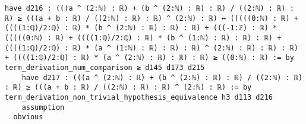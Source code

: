 \documentclass{article}
\begin{document}
\begin{tcolorbox}[colback=white!10, width=\linewidth]
\begin{lstlisting}[language=Lean4]
    have d216 : (((a ^ (2:ℕ) : ℝ) + (b ^ (2:ℕ) : ℝ) : ℝ) / ((2:ℕ) : ℝ) : ℝ) ≥ (((a + b : ℝ) / ((2:ℕ) : ℝ) : ℝ) ^ (2:ℕ) : ℝ) ↔ (((((0:ℕ) : ℝ) + ((((1:ℚ)/2:ℚ) : ℝ) * (b ^ (2:ℕ) : ℝ) : ℝ) : ℝ) + (((-1:ℤ) : ℝ) * (((((0:ℕ) : ℝ) + ((((1:ℚ)/2:ℚ) : ℝ) * (b ^ (1:ℕ) : ℝ) : ℝ) : ℝ) + ((((1:ℚ)/2:ℚ) : ℝ) * (a ^ (1:ℕ) : ℝ) : ℝ) : ℝ) ^ (2:ℕ) : ℝ) : ℝ) : ℝ) + ((((1:ℚ)/2:ℚ) : ℝ) * (a ^ (2:ℕ) : ℝ) : ℝ) : ℝ) ≥ ((0:ℕ) : ℝ) := by term_derivation_num_comparison ≥ d145 d173 d215
    have d217 : (((a ^ (2:ℕ) : ℝ) + (b ^ (2:ℕ) : ℝ) : ℝ) / ((2:ℕ) : ℝ) : ℝ) ≥ (((a + b : ℝ) / ((2:ℕ) : ℝ) : ℝ) ^ (2:ℕ) : ℝ) := by term_derivation_non_trivial_hypothesis_equivalence h3 d113 d216
    assumption
  obvious

\end{lstlisting}
\end{tcolorbox}
\end{document}
